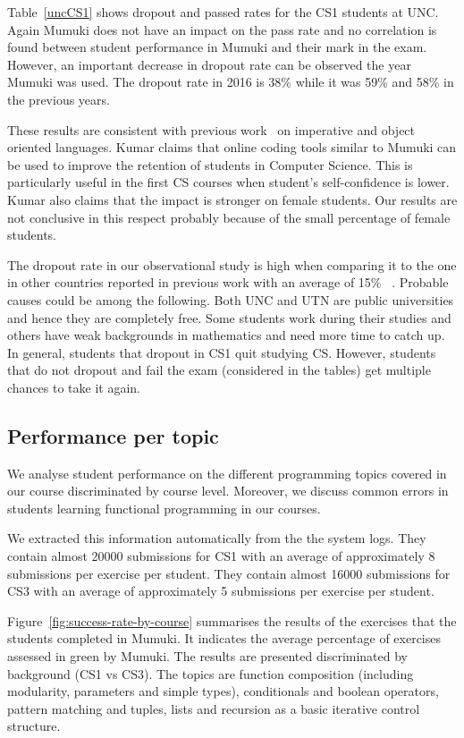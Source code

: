 Table~\ref{uncCS1} shows dropout and passed rates for the CS1 students at UNC. Again Mumuki does not have an impact on the pass rate and no correlation is found between student performance in Mumuki and their mark in the exam. However, an important decrease in dropout rate can be observed the year Mumuki was used. The dropout rate in 2016 is 38\% while it was 59\% and 58\% in the previous years.  

These results are consistent with previous work~\cite{Kumar:2008} on imperative and object oriented languages. Kumar claims that online coding tools similar to Mumuki can be used to improve the retention of students in Computer Science. This is particularly useful in the first CS courses when student's self-confidence is lower. Kumar also claims that the impact is stronger on female students. Our results are not conclusive in this respect probably because of the small percentage of female students. 

The dropout rate in our observational study is high when comparing it to the one in other countries reported in previous work with an average of 15\% ~\cite{Watson:2014}. Probable causes could be among the following. Both UNC and UTN are public universities and hence they are completely free. Some students work during their studies and others have weak backgrounds in mathematics and need more time to catch up. In general, students that dropout in CS1 quit studying CS. However, students that do not dropout and fail the exam (considered in the tables) get multiple chances to take it again.    

\subsection{Performance per topic}

We  analyse  student  performance on the different programming topics covered in our course  discriminated  by course level.   Moreover,  we  discuss  common errors in students learning functional programming in our courses. 

We extracted this information automatically from the the system logs. They contain almost 20000 submissions for CS1 with an average of approximately 8 submissions per exercise per student. They contain almost 16000 submissions for CS3 with an average of approximately 5 submissions per exercise per student.  

Figure~\ref{fig:success-rate-by-course} summarises the results of the exercises that the students completed in Mumuki. It indicates the average percentage of exercises assessed in green by Mumuki. The results are presented discriminated by background (CS1 vs CS3). The topics are function composition (including modularity, parameters and simple types), conditionals and boolean operators, pattern matching and tuples, lists and recursion as a basic iterative control structure. 

